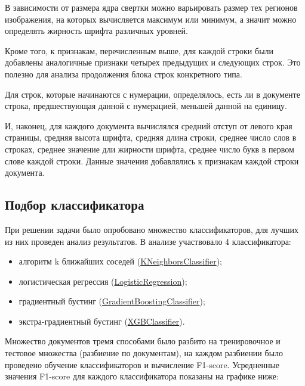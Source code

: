 \documentclass[a4paper,12pt]{article}
\begin{document}
В зависимости от размера ядра свертки можно варьировать размер тех регионов изображения, на которых вычисляется максимум или минимум, а значит можно определять жирность шрифта различных уровней.

Кроме того, к признакам, перечисленным выше, для каждой строки были добавлены аналогичные признаки четырех предыдущих и следующих строк. Это полезно для анализа продолжения блока строк конкретного типа.

Для строк, которые начинаются с нумерации, определялось, есть ли в документе строка, предшествующая данной с нумерацией, меньшей данной на единицу.

И, наконец, для каждого документа вычислялся средний отступ от левого края страницы, средняя высота шрифта, средняя длина строки, среднее число слов в строках, среднее значение дли жирности шрифта, среднее число букв в первом слове каждой строки. Данные значения добавлялись к признакам каждой строки документа.

\subsection{Подбор классификатора}

При решении задачи было опробовано множество классификаторов, для лучших из них проведен анализ результатов. В анализе участвовало 4 классификатора:

\begin{itemize}

	\item алгоритм k ближайших соседей (\href{https://scikit-learn.org/stable/modules/generated/sklearn.neighbors.KNeighborsClassifier.html}{KNeighborsClassifier});
	\item логистическая регрессия (\href{https://scikit-learn.org/stable/modules/generated/sklearn.linear_model.LogisticRegression.html}{LogisticRegression});
	\item градиентный бустинг (\href{https://scikit-learn.org/stable/modules/generated/sklearn.ensemble.GradientBoostingClassifier.html}{GradientBoostingClassifier});
	\item экстра-градиентный бустинг (\href{https://xgboost.readthedocs.io/en/latest/}{XGBClassifier}).

\end{itemize}

Множество документов тремя способами было разбито на тренировочное и тестовое множества (разбиение по документам), на каждом разбиении было проведено обучение классификаторов и вычисление F1-score. Усредненные значения F1-score для каждого классификатора показаны на графике ниже:
\end{document}
